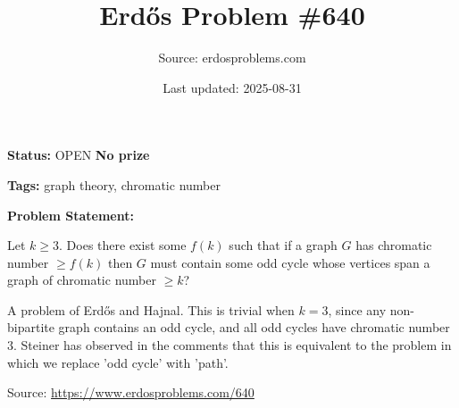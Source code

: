 \documentclass{article}
\title{Erd\H{o}s Problem \#640}
\date{Last updated: 2025-08-31}
\author{Source: erdosproblems.com}
\begin{document}
\maketitle

\noindent\textbf{Status:} OPEN \quad \textbf{No prize}

\noindent\textbf{Tags:} graph theory, chromatic number

\medskip

\noindent\textbf{Problem Statement:}

Let $k\geq 3$. Does there exist some $f(k)$ such that if a graph $G$ has chromatic number $\geq f(k)$ then $G$ must contain some odd cycle whose vertices span a graph of chromatic number $\geq k$?




A problem of Erd\H{o}s and Hajnal. This is trivial when $k=3$, since any non-bipartite graph contains an odd cycle, and all odd cycles have chromatic number $3$. Steiner has observed in the comments that this is equivalent to the problem in which we replace 'odd cycle' with 'path'.


\bigskip
\noindent\small{Source: \url{https://www.erdosproblems.com/640}}
\end{document}
